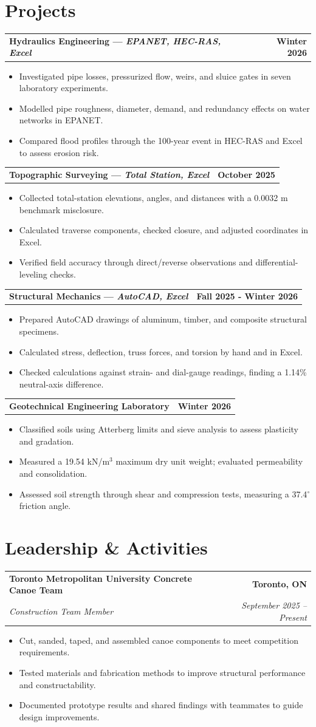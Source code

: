 \documentclass[11pt]{article}
\newcommand{\entry}[4]{%
  \begin{tabularx}{\textwidth}{X r}
    \textbf{#1} & \textbf{#2} \\
    \textit{#3} & \textit{#4} \\
  \end{tabularx}\vspace{-2pt}
}
\newcommand{\entrySingle}[2]{%
  \begin{tabularx}{\textwidth}{X r}
    \textbf{#1} & \textbf{#2}
  \end{tabularx}\vspace{-2pt}
}
\newcommand{\tightItem}[1]{\item \small #1}
\begin{document}
\section*{Projects}
\entrySingle{Hydraulics Engineering \;—\; \textit{EPANET, HEC-RAS, Excel}}{Winter 2026}
\begin{itemize}
  \tightItem{Investigated pipe losses, pressurized flow, weirs, and sluice gates in seven laboratory experiments.}
  \tightItem{Modelled pipe roughness, diameter, demand, and redundancy effects on water networks in EPANET.}
  \tightItem{Compared flood profiles through the 100-year event in HEC-RAS and Excel to assess erosion risk.}
\end{itemize}

\entrySingle{Topographic Surveying  \;—\; \textit{Total Station, Excel}}{October 2025}
\begin{itemize}
  \tightItem{Collected total-station elevations, angles, and distances with a 0.0032 m benchmark misclosure.}
  \tightItem{Calculated traverse components, checked closure, and adjusted coordinates in Excel.}
  \tightItem{Verified field accuracy through direct/reverse observations and differential-leveling checks.}
\end{itemize}

\entrySingle{Structural Mechanics \;—\; \textit{AutoCAD, Excel}}{Fall 2025 - Winter 2026}
\begin{itemize}
  \tightItem{Prepared AutoCAD drawings of aluminum, timber, and composite structural specimens.}
  \tightItem{Calculated stress, deflection, truss forces, and torsion by hand and in Excel.}
\tightItem{Checked calculations against strain- and dial-gauge readings, finding a 1.14\% neutral-axis difference.}
\end{itemize}

\entrySingle{Geotechnical Engineering Laboratory}{Winter 2026}
\begin{itemize}
  \tightItem{Classified soils using Atterberg limits and sieve analysis to assess plasticity and gradation.}
  \tightItem{Measured a 19.54 kN/m$^3$ maximum dry unit weight; evaluated permeability and consolidation.}
  \tightItem{Assessed soil strength through shear and compression tests, measuring a 37.4$^{\circ}$ friction angle.}
\end{itemize}

\section*{Leadership \& Activities}
\entry
{Toronto Metropolitan University Concrete Canoe Team}{Toronto, ON}
{Construction Team Member }{September 2025 -- Present}
\begin{itemize}
  \tightItem{Cut, sanded, taped, and assembled canoe components to meet competition requirements.}
  \tightItem{Tested materials and fabrication methods to improve structural performance and constructability.}
  \tightItem{Documented prototype results and shared findings with teammates to guide design improvements.}
\end{itemize}
\end{document}

